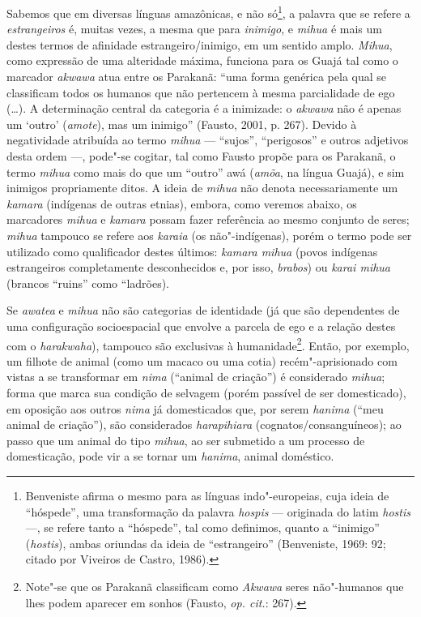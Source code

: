 Sabemos que em diversas línguas amazônicas, e não só\footnote{Benveniste
  afirma o mesmo para as línguas indo"-europeias, cuja ideia de
  ``hóspede'', uma transformação da palavra \emph{hospis} --- originada do
  latim \emph{hostis} ---, se refere tanto a ``hóspede'', tal como
  definimos, quanto a ``inimigo'' (\emph{hostis}), ambas oriundas da ideia
  de ``estrangeiro'' (Benveniste, 1969: 92; citado por Viveiros de Castro,
  1986).}, a palavra que se refere a \emph{estrangeiros} é, muitas
vezes, a mesma que para \emph{inimigo}, e \emph{mihua} é mais um destes
termos de afinidade estrangeiro/inimigo, em um sentido amplo.
\emph{Mihua}, como expressão de uma alteridade máxima, funciona para os
Guajá tal como o marcador \emph{akwawa} atua entre os Parakanã: ``uma
forma genérica pela qual se classificam todos os humanos que não
pertencem à mesma parcialidade de ego (\ldots{}). A determinação central da
categoria é a inimizade: o \emph{akwawa} não é apenas um `outro'
(\emph{amote}), mas um inimigo'' (Fausto, 2001, p. 267). Devido à
negatividade atribuída ao termo \emph{mihua} --- ``sujos'', ``perigosos'' e
outros adjetivos desta ordem ---, pode"-se cogitar, tal como Fausto propõe
para os Parakanã, o termo \emph{mihua} como mais do que um ``outro'' awá
(\emph{amõa}, na língua Guajá), e sim inimigos propriamente ditos. A
ideia de \emph{mihua} não denota necessariamente um \emph{kamara}
(indígenas de outras etnias), embora, como veremos abaixo, os marcadores
\emph{mihua} e \emph{kamara} possam fazer referência ao mesmo conjunto
de seres; \emph{mihua} tampouco se refere aos \emph{karaia} (os
não"-indígenas), porém o termo pode ser utilizado como qualificador
destes últimos: \emph{kamara mihua} (povos indígenas estrangeiros
completamente desconhecidos e, por isso, \emph{brabos}) ou \emph{karai
mihua} (brancos ``ruins'' como ``ladrões).

Se \emph{awatea} e \emph{mihua} não são categorias de identidade (já que
são dependentes de uma configuração socioespacial que envolve a parcela
de ego e a relação destes com o \emph{harakwaha}), tampouco são
exclusivas à humanidade\footnote{Note"-se que os Parakanã classificam
  como \emph{Akwawa} seres {não"-humanos} que lhes podem aparecer em
  sonhos (Fausto, \emph{op. cit.}: 267).}. Então, por exemplo, um filhote de
animal (como um macaco ou uma cotia) recém"-aprisionado com vistas a se
transformar em \emph{nima} (``animal de criação'') é considerado
\emph{mihua}; forma que marca sua condição de selvagem (porém passível
de ser domesticado), em oposição aos outros \emph{nima} já domesticados
que, por serem \emph{hanima} (``meu animal de criação''), são considerados
\emph{harapihiara} (cognatos/consanguíneos); ao passo que um animal do
tipo \emph{mihua}, ao ser submetido a um processo de domesticação, pode
vir a se tornar um \emph{hanima}, animal doméstico.

